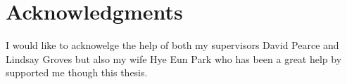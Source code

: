 
\chapter*{Acknowledgments}\label{C:ack} 

I would like to acknowelge the help of both my supervisors David Pearce and Lindsay Groves but also my wife Hye Eun Park who has been a great help by supported me though this thesis.
